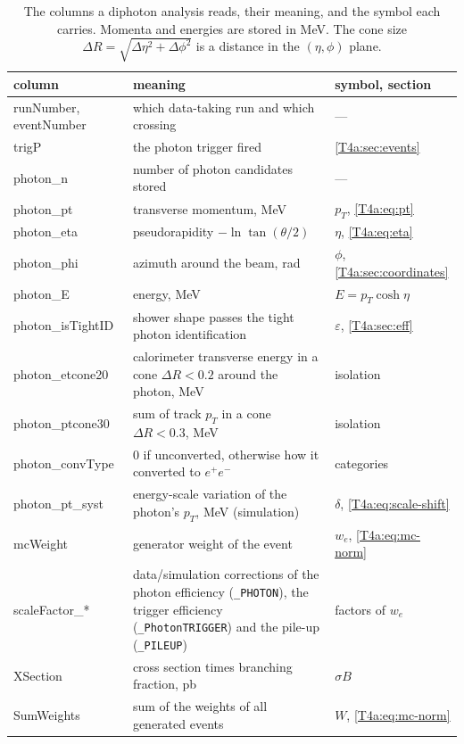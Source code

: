 \begin{table}[htbp]
\centering
\small
\begin{tabularx}{\linewidth}{>{\raggedright\arraybackslash\ttfamily}p{3.6cm} >{\raggedright\arraybackslash}X >{\raggedright\arraybackslash}p{2.9cm}}
\toprule
\normalfont column & meaning & symbol, section \\
\midrule
runNumber, eventNumber & which data-taking run and which crossing & --- \\
trigP & the photon trigger fired & \cref{T4a:sec:events} \\
photon\_n & number of photon candidates stored & --- \\
photon\_pt & transverse momentum, MeV & $p_T$, \eqref{T4a:eq:pt} \\
photon\_eta & pseudorapidity $-\ln\tan(\theta/2)$ & $\eta$, \eqref{T4a:eq:eta} \\
photon\_phi & azimuth around the beam, rad & $\phi$, \cref{T4a:sec:coordinates} \\
photon\_E & energy, MeV & $E=p_T\cosh\eta$ \\
photon\_isTightID & shower shape passes the tight photon identification & $\varepsilon$, \cref{T4a:sec:eff} \\
photon\_etcone20 & calorimeter transverse energy in a cone $\Delta R<0.2$ around the photon, MeV & isolation \\
photon\_ptcone30 & sum of track $p_T$ in a cone $\Delta R<0.3$, MeV & isolation \\
photon\_convType & $0$ if unconverted, otherwise how it converted to $e^+e^-$ & categories \\
photon\_pt\_syst & energy-scale variation of the photon's $p_T$, MeV (simulation) & $\delta$, \eqref{T4a:eq:scale-shift} \\
mcWeight & generator weight of the event & $w_e$, \eqref{T4a:eq:mc-norm} \\
scaleFactor\_* & data/simulation corrections of the photon efficiency (\texttt{\_PHOTON}), the trigger efficiency (\texttt{\_PhotonTRIGGER}) and the pile-up (\texttt{\_PILEUP}) & factors of $w_e$ \\
XSection & cross section times branching fraction, pb & $\sigma B$ \\
SumWeights & sum of the weights of all generated events & $W$, \eqref{T4a:eq:mc-norm} \\
\bottomrule
\end{tabularx}
\caption{The columns a diphoton analysis reads, their meaning, and the symbol each carries. Momenta and energies are stored in MeV. The cone size $\Delta R=\sqrt{\Delta\eta^2+\Delta\phi^2}$ is a distance in the $(\eta,\phi)$ plane.}
\label{T4a:tab:columns}
\end{table}

